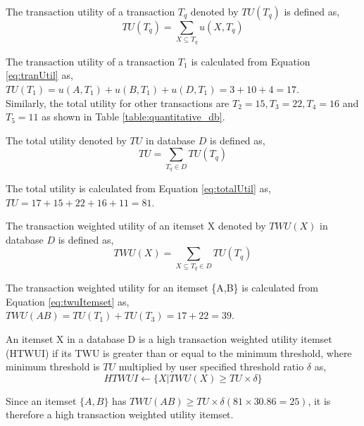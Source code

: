 \documentclass[11pt,openright]{report}
\begin{document}
\begin{definition}
	The transaction utility of a transaction $T_q$ denoted by $TU(T_q)$ is defined as,
	\begin{equation}
	TU(T_q) = \sum_{X \subseteq T_q} u(X, T_q) \label{eq:tranUtil}
	\end{equation}
\end{definition}
The transaction utility of a transaction $T_1$ is calculated from Equation \ref{eq:tranUtil} as,\\
\indent$TU(T_1) = u(A,T_1) + u(B,T_1) + u(D,T_1) = 3 + 10 + 4 = 17$.\\
Similarly, the total utility for other transactions are $T_2 = 15, T_3 = 22, T_4 = 16$ and $T_5 = 11$ as shown in Table \ref{table:quantitative_db}.

\begin{definition}
	The total utility denoted by $TU$ in database $D$ is defined as,
	\begin{equation}
	TU = \sum_{T_q \in D} TU(T_q) \label{eq:totalUtil}
	\end{equation}
\end{definition}
 The total utility is calculated from Equation \ref{eq:totalUtil} as,\\
 \indent $TU = 17 + 15 + 22 + 16 + 11 = 81$.

\begin{definition}
	The transaction weighted utility of an itemset X denoted by $TWU(X)$ in database $D$ is defined as,
	\begin{equation}
	TWU(X) = \sum_{X \subseteq T_q \in D} TU(T_q) \label{eq:twuItemset}
	\end{equation}
\end{definition}
 The transaction weighted utility for an itemset \{A,B\} is calculated from Equation \ref{eq:twuItemset} as,\\
 \indent$TWU(AB) = TU(T_1) + TU(T_3) = 17 + 22 = 39$.

\begin{definition}
	An itemset X in a database D is a high transaction weighted utility itemset (HTWUI) if its TWU is greater than or equal to the minimum threshold, where minimum threshold is $TU$ multiplied by user specified threshold ratio $\delta$ as,
	\begin{equation}
	HTWUI \gets \{X|TWU(X) \ge TU \times \delta \} \label{eq:htwui}
	\end{equation}
\end{definition}
Since an itemset $\{A,B\}$ has $TWU(AB) \ge TU \times \delta (81 \times 30.86 = 25)$, it is therefore a high transaction weighted utility itemset. 
\end{document}
